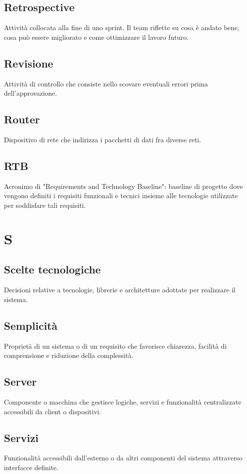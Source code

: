 \documentclass[a4paper,12pt]{article}
\begin{document}
          \subsection*{Retrospective}
			Attività collocata alla fine di uno sprint. Il team riflette su cosa è andato bene, cosa può essere migliorato e come ottimizzare il lavoro futuro.
          \subsection*{Revisione}
			Attività di controllo che consiste nello scovare eventuali errori prima dell'approvazione.
          \subsection*{Router}
			Dispositivo di rete che indirizza i pacchetti di dati fra diverse reti.
          \subsection*{RTB}
			Acronimo di "Requirements and Technology Baseline": baseline di progetto dove vengono definiti i requisiti funzionali e tecnici insieme alle tecnologie utilizzate per soddisfare tali requisiti.
        
\newpage
      
        \section{S}
        
          \subsection*{Scelte tecnologiche}
			Decisioni relative a tecnologie, librerie e architetture adottate per realizzare il sistema.
          \subsection*{Semplicità}
			Proprietà di un sistema o di un requisito che favorisce chiarezza, facilità di comprensione e riduzione della complessità.
          \subsection*{Server}
			Componente o macchina che gestisce logiche, servizi e funzionalità centralizzate accessibili da client o dispositivi.
          \subsection*{Servizi}
			Funzionalità accessibili dall'esterno o da altri componenti del sistema attraverso interfacce definite.
\end{document}
